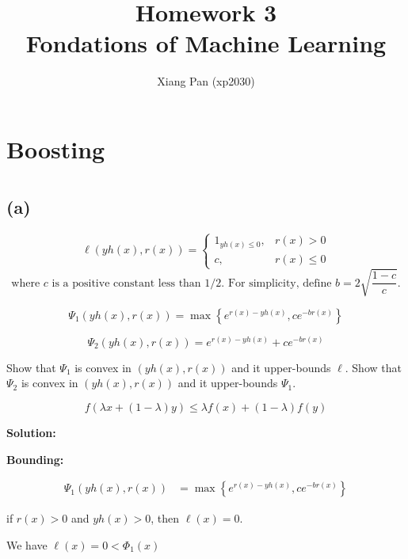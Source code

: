 \documentclass{article}
\title{%
     Homework 3 \\
    \large Fondations of Machine Learning \\}
\author{Xiang Pan (xp2030)}
\begin{document}
\maketitle
\section*{Boosting}
\section{}
\subsection*{(a)}

\begin{equation}
    \ell(y h(x), r(x))= \begin{cases}1_{y h(x) \leq 0}, & r(x)>0 \\ c, & r(x) \leq 0\end{cases}
\end{equation}
$$
    \text { where } c \text { is a positive constant less than } 1 / 2 . \text { For simplicity, define } b=2 \sqrt{\frac{1-c}{c}} \text {. }
$$

\begin{equation}
    \Psi_{1}(y h(x), r(x))=\max \left\{e^{r(x)-y h(x)}, c e^{-b r(x)}\right\}
\end{equation}

\begin{equation}
    \Psi_{2}(y h(x), r(x))=e^{r(x)-y h(x)}+c e^{-b r(x)}
\end{equation}

Show that $\Psi_{1}$ is convex in $(y h(x), r(x))$ and it upper-bounds $\ell$. Show that $\Psi_{2}$ is convex in $(y h(x), r(x))$ and it upper-bounds $\Psi_{1}$.

\begin{equation}
    f(\lambda x+(1-\lambda) y) \leq \lambda f(x)+(1-\lambda) f(y)
\end{equation}


\textbf{Solution:}

\textbf{Bounding:}

\begin{align}
    \Psi_{1} ( y h(x), r(x) ) & = \max \left\{e^{r(x)-y h(x)}, c e^{-b r(x)}\right\}
\end{align}


if $r(x) > 0$ and $y h(x) > 0$, then $\ell(x) = 0$.

We have $\ell(x) = 0 < \Phi_{1}(x)$
\end{document}
